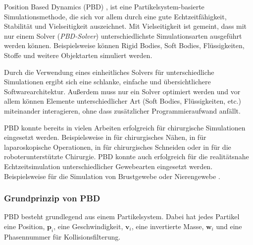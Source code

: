 Position Based Dynamics (PBD) \cite{PBD}, ist eine Partikelsystem-basierte Simulationsmethode, die sich vor allem durch eine gute Echtzeitfähigkeit, Stabilität und Vielseitigkeit auszeichnet. Mit Vielseitigkeit ist gemeint, dass mit nur einem Solver (\textit{PBD-Solver}) unterschiedlichste Simulationsarten ausgeführt werden können. Beispielsweise können Rigid Bodies, Soft Bodies, Flüssigkeiten, Stoffe und weitere Objektarten simuliert werden. 

Durch die Verwendung eines einheitliches Solvers für unterschiedliche Simulationen ergibt sich eine schlanke, einfache und übersichtlichere Softwarearchitektur. Außerdem muss nur ein Solver optimiert werden und vor allem können Elemente unterschiedlicher Art (Soft Bodies, Flüssigkeiten, etc.) miteinander interagieren, ohne dass zusätzlicher Programmieraufwand anfällt.

PBD konnte bereits in vielen Arbeiten erfolgreich für chirurgische Simulationen eingesetzt werden. Beispielsweise in \cite{PBDThread} für chirurgisches Nähen, in \cite{VRLaparoscop} für laparoskopische Operationen, in \cite{PBDCutting} für chirurgisches Schneiden oder in \cite{VRRobSim} für die roboterunterstützte Chirurgie. 
PBD konnte auch erfolgreich für die realitätsnahe Echtzeitsimulation unterschiedlicher Gewebearten eingesetzt werden. Beispielsweise für die Simulation von Brustgewebe \cite{BreastBiopsy} oder Nierengewebe \cite{PBDKidney}.

\subsubsection{Grundprinzip von PBD}

\ac{PBD} besteht grundlegend aus einem Partikelsystem. Dabei hat jedes Partikel eine Position, $\textbf{p}_i$, eine Geschwindigkeit, $\textbf{v}_i$, eine invertierte Masse, $\textbf{w}_i$ und eine Phasennummer für Kollisionsfilterung. 

